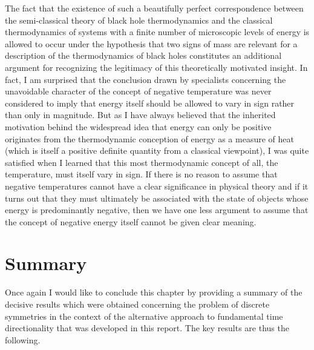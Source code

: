 \documentclass[notitlepage,12pt]{report}
\begin{document}
The fact that the existence of such a beautifully perfect correspondence between the semi-classical theory of black hole thermodynamics and the classical thermodynamics of systems with a finite number of microscopic levels of energy is allowed to occur under the hypothesis that two signs of mass are relevant for a description of the thermodynamics of black holes constitutes an additional argument for recognizing the legitimacy of this theoretically motivated insight. In fact, I am surprised that the conclusion drawn by specialists concerning the unavoidable character of the concept of negative temperature was never considered to imply that energy itself should be allowed to vary in sign rather than only in magnitude. But as I have always believed that the inherited motivation behind the widespread idea that energy can only be positive originates from the thermodynamic conception of energy as a measure of heat (which is itself a positive definite quantity from a classical viewpoint), I was quite satisfied when I learned that this most thermodynamic concept of all, the temperature, must itself vary in sign. If there is no reason to assume that negative temperatures cannot have a clear significance in physical theory and if it turns out that they must ultimately be associated with the state of objects whose energy is predominantly negative, then we have one less argument to assume that the concept of negative energy itself cannot be given clear meaning.

\section{Summary}

Once again I would like to conclude this chapter by providing a summary of the decisive results which were obtained concerning the problem of discrete symmetries in the context of the alternative approach to fundamental time directionality that was developed in this report. The key results are thus the following.
\end{document}

